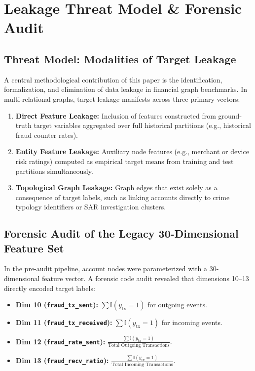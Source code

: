\section{Leakage Threat Model \&  Forensic Audit}
\label{sec:leakage}

\subsection{Threat Model: Modalities of Target Leakage}
A central methodological contribution of this paper is the identification, formalization, and elimination of data leakage in financial graph benchmarks. In multi-relational graphs, target leakage manifests across three primary vectors:
\begin{enumerate}
    \item \textbf{Direct Feature Leakage:} Inclusion of features constructed from ground-truth target variables aggregated over full historical partitions (e.g., historical fraud counter rates).
    \item \textbf{Entity Feature Leakage:} Auxiliary node features (e.g., merchant or device risk ratings) computed as empirical target means from training and test partitions simultaneously.
    \item \textbf{Topological Graph Leakage:} Graph edges that exist solely as a consequence of target labels, such as linking accounts directly to crime typology identifiers or SAR investigation clusters.
\end{enumerate}

\subsection{Forensic Audit of the Legacy 30-Dimensional Feature Set}
In the pre-audit pipeline, account nodes were parameterized with a 30-dimensional feature vector. A forensic code audit revealed that dimensions 10--13 directly encoded target labels:
\begin{itemize}
    \item \textbf{Dim 10 (\texttt{fraud\_tx\_sent}):} $\sum \mathbb{I}(y_{\text{tx}} = 1)$ for outgoing events.
    \item \textbf{Dim 11 (\texttt{fraud\_tx\_received}):} $\sum \mathbb{I}(y_{\text{tx}} = 1)$ for incoming events.
    \item \textbf{Dim 12 (\texttt{fraud\_rate\_sent}):} $\frac{\sum \mathbb{I}(y_{\text{tx}} = 1)}{\text{Total Outgoing Transactions}}$.
    \item \textbf{Dim 13 (\texttt{fraud\_recv\_ratio}):} $\frac{\sum \mathbb{I}(y_{\text{tx}} = 1)}{\text{Total Incoming Transactions}}$.
\end{itemize}


